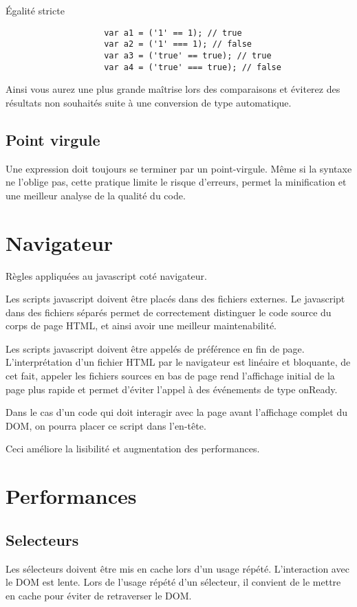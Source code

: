 			\begin{cbox}{\'Egalité stricte}
				\begin{verbatim}
					var a1 = ('1' == 1); // true
					var a2 = ('1' === 1); // false
					var a3 = ('true' == true); // true
					var a4 = ('true' === true); // false
				\end{verbatim}
			\end{cbox}

			Ainsi vous aurez une plus grande maîtrise lors des comparaisons et éviterez des résultats non souhaités suite à une conversion de type automatique.

		\subsection{Point virgule}
			Une expression doit toujours se terminer par un point-virgule. Même si la syntaxe ne l'oblige pas, cette pratique limite le risque d'erreurs, permet la minification et une meilleur analyse de la qualité du code.

	\section{Navigateur}
		Règles appliquées au javascript coté navigateur.

		Les scripts javascript doivent être placés dans des fichiers externes. Le javascript dans des fichiers séparés permet de correctement distinguer le code source du corps de page HTML, et ainsi avoir une meilleur maintenabilité.

		Les scripts javascript doivent être appelés de préférence en fin de page. L'interprétation d'un fichier HTML par le navigateur est linéaire et bloquante, de cet fait, appeler les fichiers sources en bas de page rend l’affichage initial de la page plus rapide et permet d'éviter l'appel à des événements de type onReady.

		Dans le cas d'un code qui doit interagir avec la page avant l’affichage complet du DOM, on pourra placer ce script dans l'en-tête.

		Ceci améliore la lisibilité et augmentation des performances.

	\section{Performances}
		\subsection{Selecteurs}
			Les sélecteurs doivent être mis en cache lors d'un usage répété. L'interaction avec le DOM est lente. Lors de l'usage répété d'un sélecteur, il convient de le mettre en cache pour éviter de retraverser le DOM.

